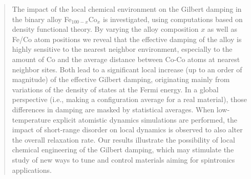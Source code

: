 \documentclass[twocolumn,preprintnumbers,superscriptaddress,amsmath,amssymb,prb]{revtex4-2}
\begin{document}
\begin{abstract}
The impact of the local chemical environment on the Gilbert damping in the binary alloy Fe$_{100-x}$Co$_{x}$ is investigated, using computations based on density functional theory.
By varying the alloy composition $x$ as well as Fe/Co atom positions we reveal that the effective damping of the alloy is highly sensitive to the nearest neighbor environment, especially to the amount of Co and the average distance between Co-Co atoms at nearest neighbor sites. Both lead to a significant local increase (up to an order of magnitude) of the effective Gilbert damping, originating mainly from variations of the density of states at the Fermi energy. In a global perspective (i.e., making a configuration average for a real material), those differences in damping are masked by statistical averages.
When low-temperature explicit atomistic dynamics simulations are performed, the impact of short-range disorder on local dynamics is observed to also alter the overall relaxation rate. Our results illustrate the possibility of local chemical engineering of the Gilbert damping, which may stimulate the study of new ways to tune and control materials aiming for spintronics applications.
\end{abstract}

\maketitle 









\clearpage
\appendix

\end{document}
